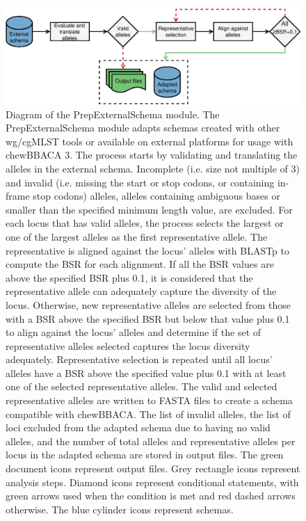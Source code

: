 \newpage
\begin{figure}[h!]
    \centering
    \includegraphics[angle=0,width=\textwidth]{figures/chapter 2/FigureS8.pdf}
    \caption{Diagram of the PrepExternalSchema module. The PrepExternalSchema module adapts schemas created with other wg/cgMLST tools or available on external platforms for usage with chewBBACA 3. The process starts by validating and translating the alleles in the external schema. Incomplete (i.e. size not multiple of 3) and invalid (i.e. missing the start or stop codons, or containing in-frame stop codons) alleles, alleles containing ambiguous bases or smaller than the specified minimum length value, are excluded. For each locus that has valid alleles, the process selects the largest or one of the largest alleles as the first representative allele. The representative is aligned against the locus' alleles with BLASTp to compute the BSR for each alignment. If all the BSR values are above the specified BSR plus 0.1, it is considered that the representative allele can adequately capture the diversity of the locus. Otherwise, new representative alleles are selected from those with a BSR above the specified BSR but below that value plus 0.1 to align against the locus' alleles and determine if the set of representative alleles selected captures the locus diversity adequately. Representative selection is repeated until all locus' alleles have a BSR above the specified value plus 0.1 with at least one of the selected representative alleles. The valid and selected representative alleles are written to FASTA files to create a schema compatible with chewBBACA. The list of invalid alleles, the list of loci excluded from the adapted schema due to having no valid alleles, and the number of total alleles and representative alleles per locus in the adapted schema are stored in output files. The green document icons represent output files. Grey rectangle icons represent analysis steps. Diamond icons represent conditional statements, with green arrows used when the condition is met and red dashed arrows otherwise. The blue cylinder icons represent schemas.}
    \label{fig:chap2_figureS8}
\end{figure}

